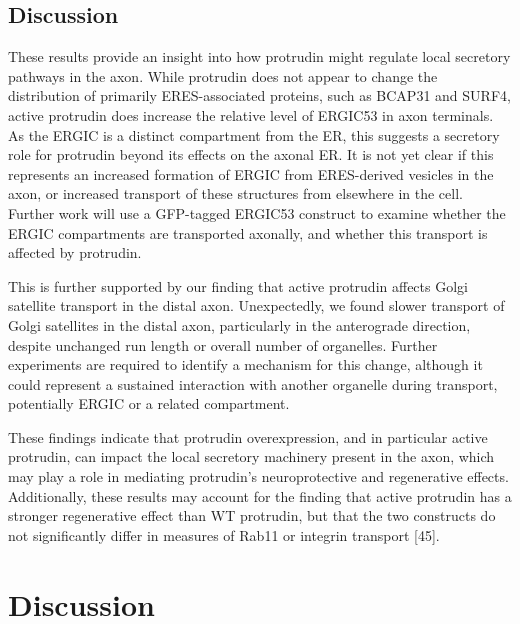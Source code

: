 \documentclass[
  12pt,
  a4paper,
]{book}
\begin{document}
\hypertarget{discussion-1}{%
\section{Discussion}\label{discussion-1}}

These results provide an insight into how protrudin might regulate local secretory pathways in the axon. While protrudin does not appear to change the distribution of primarily ERES-associated proteins, such as BCAP31 and SURF4, active protrudin does increase the relative level of ERGIC53 in axon terminals. As the ERGIC is a distinct compartment from the ER, this suggests a secretory role for protrudin beyond its effects on the axonal ER. It is not yet clear if this represents an increased formation of ERGIC from ERES-derived vesicles in the axon, or increased transport of these structures from elsewhere in the cell. Further work will use a GFP-tagged ERGIC53 construct to examine whether the ERGIC compartments are transported axonally, and whether this transport is affected by protrudin.

This is further supported by our finding that active protrudin affects Golgi satellite transport in the distal axon. Unexpectedly, we found slower transport of Golgi satellites in the distal axon, particularly in the anterograde direction, despite unchanged run length or overall number of organelles. Further experiments are required to identify a mechanism for this change, although it could represent a sustained interaction with another organelle during transport, potentially ERGIC or a related compartment.

These findings indicate that protrudin overexpression, and in particular active protrudin, can impact the local secretory machinery present in the axon, which may play a role in mediating protrudin's neuroprotective and regenerative effects. Additionally, these results may account for the finding that active protrudin has a stronger regenerative effect than WT protrudin, but that the two constructs do not significantly differ in measures of Rab11 or integrin transport {[}45{]}.

\hypertarget{DISCUSSION}{%
\chapter*{Discussion}\label{DISCUSSION}}

\setcounter{chapter}{4}
\setcounter{section}{0}
\setcounter{figure}{0}
\end{document}
